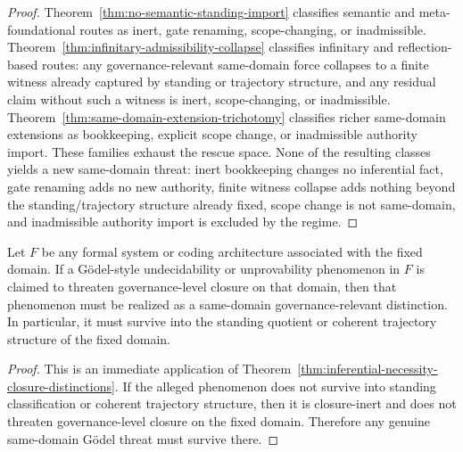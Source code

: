 \begin{proof}
Theorem~\ref{thm:no-semantic-standing-import} classifies semantic and meta-foundational routes as inert, gate renaming, scope-changing, or inadmissible. Theorem~\ref{thm:infinitary-admissibility-collapse} classifies infinitary and reflection-based routes: any governance-relevant same-domain force collapses to a finite witness already captured by standing or trajectory structure, and any residual claim without such a witness is inert, scope-changing, or inadmissible. Theorem~\ref{thm:same-domain-extension-trichotomy} classifies richer same-domain extensions as bookkeeping, explicit scope change, or inadmissible authority import. These families exhaust the rescue space. None of the resulting classes yields a new same-domain threat: inert bookkeeping changes no inferential fact, gate renaming adds no new authority, finite witness collapse adds nothing beyond the standing/trajectory structure already fixed, scope change is not same-domain, and inadmissible authority import is excluded by the regime.
\end{proof}


\begin{theorem}
\label{thm:godel-threat-alignment}
Let $F$ be any formal system or coding architecture associated with the fixed domain. If a G\"odel-style undecidability or unprovability phenomenon in $F$ is claimed to threaten governance-level closure on that domain, then that phenomenon must be realized as a same-domain governance-relevant distinction. In particular, it must survive into the standing quotient or coherent trajectory structure of the fixed domain.
\end{theorem}

\begin{proof}
This is an immediate application of Theorem~\ref{thm:inferential-necessity-closure-distinctions}. If the alleged phenomenon does not survive into standing classification or coherent trajectory structure, then it is closure-inert and does not threaten governance-level closure on the fixed domain. Therefore any genuine same-domain G\"odel threat must survive there.
\end{proof}

